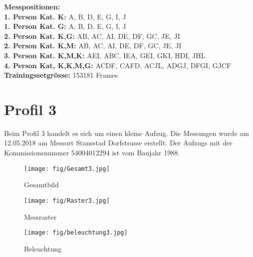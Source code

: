  \textbf{Messpositionen:}\\
\textbf{1. Person Kat. K:} A, B, D, E, G, I, J\\
\textbf{1. Person Kat. G:} A, B, D, E, G, I, J\\
\textbf{2. Person Kat. K,G:} AB, AC, AI, DE, DF, GC, JE, JI   \\
\textbf{2. Person Kat. K,M:} AB, AC, AI, DE, DF, GC, JE, JI   \\
\textbf{3. Person Kat. K,M,K:} AEI, ABC, IEA, GEI, GKI, HDI, JHL \\
\textbf{4. Person Kat, K,K,M,G:} ACDF, CAFD, ACJL, ADGJ, DFGI, GJCF \\
\textbf{Trainingssetgrösse:} 153181 Frames


	\newpage
\section{Profil 3}
Beim Profil 3 handelt es sich um einen kleine Aufzug. Die Messungen wurde am 12.05.2018 am Messort Stansstad Dorfstrasse erstellt. Der Aufzugs mit der Kommissionsnummer 54004012294 ist vom Baujahr 1988.

		
		\begin{figure}[!ht]
	\centering
	\begin{minipage}[b]{0.3\linewidth}
		\centering
		\texttt{[image: fig/Gesamt3.jpg]}
		\caption{Gesamtbild}
		\label{fig:profilAnhang7}
	\end{minipage}
	\begin{minipage}[b]{0.3\linewidth}
		\centering
		\texttt{[image: fig/Raster3.jpg]}
		\caption{Messraster}
		\label{fig:profilAnhang8}
	\end{minipage}
	\begin{minipage}[b]{0.3\linewidth}
		\centering
		\texttt{[image: fig/beleuchtung3.jpg]}
		\caption{Beleuchtung}
		\label{fig:profilAnhang9}
	\end{minipage}
\end{figure}

